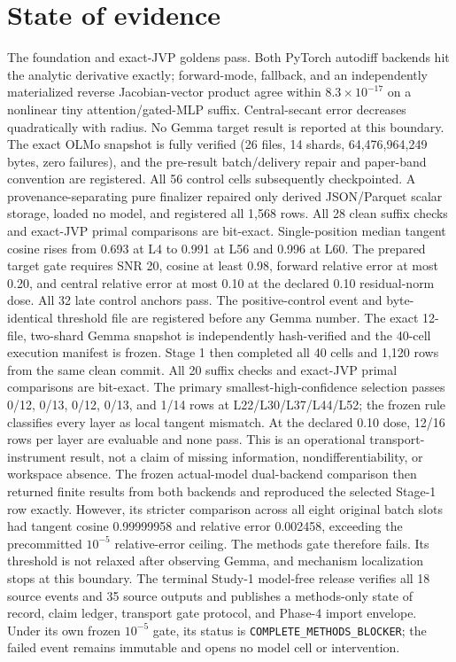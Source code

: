 \documentclass[11pt]{article}
\begin{document}
\section{State of evidence}
The foundation and exact-JVP goldens pass. Both PyTorch autodiff backends hit
the analytic derivative exactly; forward-mode, fallback, and an independently
materialized reverse Jacobian-vector product agree within $8.3\times10^{-17}$
on a nonlinear tiny attention/gated-MLP suffix. Central-secant error decreases
quadratically with radius. No Gemma target result is reported at this
boundary. The exact OLMo snapshot is fully verified (26 files, 14 shards,
64,476,964,249 bytes, zero failures), and the pre-result batch/delivery repair
and paper-band convention are registered. All 56 control cells subsequently
checkpointed. A provenance-separating pure finalizer repaired only derived
JSON/Parquet scalar storage, loaded no model, and registered all 1,568 rows.
All 28 clean suffix checks and exact-JVP primal comparisons are bit-exact.
Single-position median tangent cosine rises from 0.693 at L4 to 0.991 at L56
and 0.996 at L60. The prepared target gate requires SNR 20, cosine at least
0.98, forward relative error at most 0.20, and central relative error at most
0.10 at the declared 0.10 residual-norm dose. All 32 late control anchors
pass. The positive-control event and byte-identical threshold file are
registered before any Gemma number. The exact 12-file, two-shard Gemma
snapshot is independently hash-verified and the 40-cell execution manifest is
frozen. Stage 1 then completed all 40 cells and 1,120 rows from the same clean
commit. All 20 suffix checks and exact-JVP primal comparisons are bit-exact.
The primary smallest-high-confidence selection passes 0/12, 0/13, 0/12,
0/13, and 1/14 rows at L22/L30/L37/L44/L52; the frozen rule classifies every
layer as local tangent mismatch. At the declared 0.10 dose, 12/16 rows per
layer are evaluable and none pass. This is an operational transport-instrument
result, not a claim of missing information, nondifferentiability, or workspace
absence. The frozen actual-model dual-backend comparison then returned finite
results from both backends and reproduced the selected Stage-1 row exactly.
However, its stricter comparison across all eight original batch slots had
tangent cosine 0.99999958 and relative error 0.002458, exceeding the
precommitted $10^{-5}$ relative-error ceiling. The methods gate therefore
fails. Its threshold is not relaxed after observing Gemma, and mechanism
localization stops at this boundary.
The terminal Study-1 model-free release verifies all 18 source events and 35
source outputs and publishes a methods-only state of record, claim ledger,
transport gate protocol, and Phase-4 import envelope. Under its own frozen
$10^{-5}$ gate, its status is \texttt{COMPLETE\_METHODS\_BLOCKER}; the failed
event remains immutable and opens no model cell or intervention.
\end{document}
